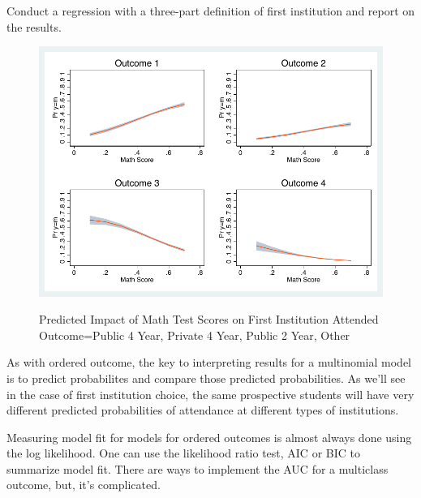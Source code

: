 \documentclass[12 pt]{article}
\begin{document}
Conduct a regression with a three-part definition of first institution
and report on the results. 


\begin{figure}
  \centering
  
  \caption{Predicted Impact of Math Test Scores on First Institution Attended
    Outcome=Public 4 Year, Private 4 Year, Public 2 Year, Other}
\includegraphics[width=\textwidth]{unorder_first}
  \label{fig:unorder_first}
\end{figure}

As with ordered outcome, the key to interpreting results for a
multinomial model is to predict probabilites and compare those
predicted probabilities.  As we'll see in the case of first
institution choice, the same prospective students will have very
different predicted probabilities of attendance at different types of
institutions. 

Measuring model fit for models for ordered outcomes is almost always
done using the log likelihood. One can use the likelihood ratio test,
AIC or BIC to summarize model fit. There are ways to implement the AUC
for a multiclass outcome, but, it's complicated. 
\end{document}
